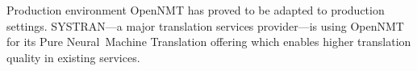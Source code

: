 \documentclass[final]{beamer}
\newlength{\onecolwid}
\begin{document}
\begin{frame}[t]
\begin{columns}[t]
\begin{column}{\onecolwid}
\begin{block}{Production environment}
        OpenNMT has proved to be adapted to production settings. SYSTRAN---a major translation services provider---is using OpenNMT for its Pure Neural\texttrademark~Machine Translation offering which enables higher translation quality in existing services.
      \end{block}

    \end{column}
  \end{columns}

\end{frame}
\end{document}
